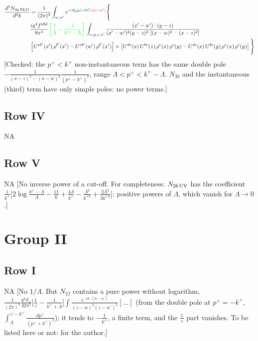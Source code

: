 \documentclass[9pt]{article}
\numberwithin{equation}{section}
\begin{document}
\begin{align}
\frac{d^{3}N_{3a\,\rm NLO}}{d^{3}k} & =\frac{1}{(2\pi)^{3}}\int_{w,w'}e^{-ik{\color{teal}\cancel{(w'-w)}}{\color{red}\cdot(w-w')}}\Bigg\{\notag \\ & \frac{ig^{4}f^{abd}}{8\pi^{5}}\,{\color{green}\left[\frac{1}{\Lambda}-\frac{1}{k^{+}-\Lambda}\right]}\,\int_{x,y,z,x'}
\frac{(x'-w')\cdot(y-z)}{(x'-w')^{2}(y-z)^{2}\,\left[(x-w)^{2}-(x-z)^{2}\right]}\notag \\ & \left[U^{ab'}(x')\,\rho^{b'}(x')-U^{ab'}(w')\, \rho^{b'}(x')\right]\times \left[U^{de}(x)\,U^{bc}(z)\, \rho^{e}(x)\,\rho^{c}(y)-U^{de}(x)\,U^{bc}(y)\,\rho^{e}(x)\,\rho^{c}(y)\right]\Bigg\}
\end{align} {\color{red}[Checked: the $p^{+}<k^{+}$ non-instantaneous term has the same double pole $-\frac{1}{(x-z)^{2}-(x-w)^{2}}\frac{1}{(p^{+}-k^{+})^{2}}$, range $\Lambda<p^{+}<k^{+}-\Lambda$. $N_{3b}$ and the instantaneous (third) term have only simple poles: no power terms.]}\par\noindent
\subsection{Row IV}
\textsc{NA}
\subsection{Row V}
\textsc{NA} {\color{red}[No inverse power of a cut-off. For completeness: $N_{2b\,\rm UV}$ has the coefficient $\frac{1}{k^{+}}\big[2\log\frac{k^{+}-\Lambda}{\Lambda}-\frac{11}{6}+\frac{4\Lambda}{k^{+}}-\frac{\Lambda^{2}}{k^{+2}}+\frac{2\Lambda^{3}}{3k^{+3}}\big]$: positive powers of $\Lambda$, which vanish for $\Lambda\to0$.]}
\section{Group II}
\subsection{Row I}
\textsc{NA} {\color{red}[No $1/\Lambda$. But $N_{2f}$ contains a pure power without logarithm, $\frac{1}{(2\pi)^{3}}\frac{g^{4}d_{\perp}}{32\pi^{5}}\big[\frac{1}{\vee}-\frac{1}{k^{+}+\Lambda}\big]\int\frac{e^{-ik\cdot(w-w^\prime)}}{(z-w)^{2}(z-w^\prime)^{2}}[\dots]$ (from the double pole at $p^{+}=-k^{+}$, $\int_{\Lambda}^{\vee-k^{+}}\frac{dp^{+}}{(p^{+}+k^{+})^{2}}$); it tends to $-\frac{1}{k^{+}}$, a finite term, and the $\frac{1}{\vee}$ part vanishes. To be listed here or not: for the author.]}
\end{document}
